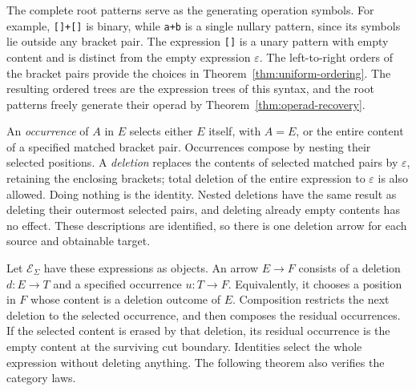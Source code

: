 \documentclass[11pt,a4paper]{article}
\theoremstyle{plain}
\theoremstyle{definition}
\theoremstyle{remark}
\begin{document}
The complete root patterns serve as the generating operation
symbols. For example, \texttt{[]+[]} is binary, while
\texttt{a+b} is a single nullary pattern, since its symbols lie
outside any bracket pair. The expression
\texttt{[]} is a unary pattern with empty content and is distinct
from the empty expression $\varepsilon$.
The left-to-right orders of the bracket pairs provide the choices
in Theorem~\ref{thm:uniform-ordering}. The resulting ordered trees
are the expression trees of this syntax, and the root patterns
freely generate their operad by Theorem~\ref{thm:operad-recovery}.

An \emph{occurrence} of $A$ in $E$ selects either $E$ itself, with
$A=E$, or the entire content of a specified matched bracket pair.
Occurrences compose by nesting their selected positions. A
\emph{deletion} replaces the contents of selected matched pairs by
$\varepsilon$, retaining the enclosing brackets; total deletion of
the entire expression to $\varepsilon$ is also allowed. Doing nothing
is the identity. Nested deletions have the same result as deleting
their outermost selected pairs, and deleting already empty contents
has no effect. These descriptions are identified, so there is one
deletion arrow for each source and obtainable target.

\label{not:bracket-category}
Let $\mathcal E_\Sigma$ have these expressions as objects. An arrow
$E\to F$ consists of a deletion $d:E\to T$ and a specified
occurrence $u:T\to F$. Equivalently, it chooses a position in $F$ whose
content is a deletion outcome of $E$. Composition restricts the next
deletion to the selected occurrence, and then composes the residual
occurrences. If the selected content is erased by that deletion, its
residual occurrence is the empty content at the surviving cut boundary.
Identities select the whole expression without deleting anything.
The following theorem also verifies the category laws.
\end{document}
